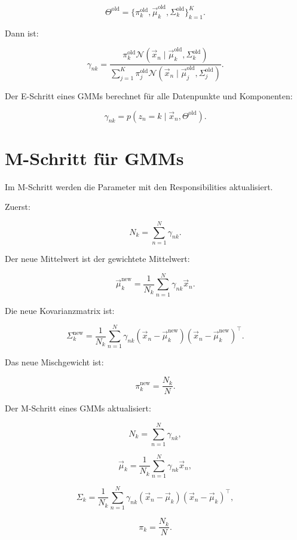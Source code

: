 \[
    \Theta^{\mathrm{old}}
    =
    \{\pi_k^{\mathrm{old}},\vec{\mu}_k^{\mathrm{old}},\Sigma_k^{\mathrm{old}}\}_{k=1}^{K}.
\]

Dann ist:

\[
    \gamma_{nk}
    =
    \frac{
        \pi_k^{\mathrm{old}}
        \mathcal{N}(\vec{x}_n\mid\vec{\mu}_k^{\mathrm{old}},\Sigma_k^{\mathrm{old}})
    }{
        \sum_{j=1}^{K}
        \pi_j^{\mathrm{old}}
        \mathcal{N}(\vec{x}_n\mid\vec{\mu}_j^{\mathrm{old}},\Sigma_j^{\mathrm{old}})
    }.
\]

\begin{definitionbox}
Der E-Schritt eines GMMs berechnet für alle Datenpunkte und Komponenten:

\[
    \gamma_{nk}
    =
    p(z_n=k\mid\vec{x}_n,\Theta^{\mathrm{old}}).
\]
\end{definitionbox}

\section{M-Schritt für GMMs}

Im M-Schritt werden die Parameter mit den Responsibilities aktualisiert.

Zuerst:

\[
    N_k
    =
    \sum_{n=1}^{N}
    \gamma_{nk}.
\]

Der neue Mittelwert ist der gewichtete Mittelwert:

\[
    \vec{\mu}_k^{\mathrm{new}}
    =
    \frac{1}{N_k}
    \sum_{n=1}^{N}
    \gamma_{nk}
    \vec{x}_n.
\]

Die neue Kovarianzmatrix ist:

\[
    \Sigma_k^{\mathrm{new}}
    =
    \frac{1}{N_k}
    \sum_{n=1}^{N}
    \gamma_{nk}
    (\vec{x}_n-\vec{\mu}_k^{\mathrm{new}})
    (\vec{x}_n-\vec{\mu}_k^{\mathrm{new}})^{\top}.
\]

Das neue Mischgewicht ist:

\[
    \pi_k^{\mathrm{new}}
    =
    \frac{N_k}{N}.
\]

\begin{definitionbox}
Der M-Schritt eines GMMs aktualisiert:

\[
    N_k
    =
    \sum_{n=1}^{N}
    \gamma_{nk},
\]

\[
    \vec{\mu}_k
    =
    \frac{1}{N_k}
    \sum_{n=1}^{N}
    \gamma_{nk}
    \vec{x}_n,
\]

\[
    \Sigma_k
    =
    \frac{1}{N_k}
    \sum_{n=1}^{N}
    \gamma_{nk}
    (\vec{x}_n-\vec{\mu}_k)
    (\vec{x}_n-\vec{\mu}_k)^{\top},
\]

\[
    \pi_k
    =
    \frac{N_k}{N}.
\]
\end{definitionbox}

